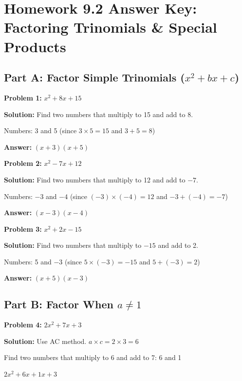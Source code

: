 \documentclass[12pt]{article}
\begin{document}
\section*{Homework 9.2 Answer Key: \\ Factoring Trinomials \& Special Products}

	\subsection*{Part A: Factor Simple Trinomials ($x^2 + bx + c$)}

		\textbf{Problem 1:} $x^2 + 8x + 15$
		
		\textbf{Solution:} Find two numbers that multiply to 15 and add to 8.
		
		Numbers: 3 and 5 (since $3 \times 5 = 15$ and $3 + 5 = 8$)
		
		\textbf{Answer:} $(x + 3)(x + 5)$

		\vspace{0.5cm}

		\textbf{Problem 2:} $x^2 - 7x + 12$
		
		\textbf{Solution:} Find two numbers that multiply to 12 and add to $-7$.
		
		Numbers: $-3$ and $-4$ (since $(-3) \times (-4) = 12$ and $-3 + (-4) = -7$)
		
		\textbf{Answer:} $(x - 3)(x - 4)$

		\vspace{0.5cm}

		\textbf{Problem 3:} $x^2 + 2x - 15$
		
		\textbf{Solution:} Find two numbers that multiply to $-15$ and add to 2.
		
		Numbers: 5 and $-3$ (since $5 \times (-3) = -15$ and $5 + (-3) = 2$)
		
		\textbf{Answer:} $(x + 5)(x - 3)$

	\newpage

	\subsection*{Part B: Factor When $a \neq 1$}

		\textbf{Problem 4:} $2x^2 + 7x + 3$
		
		\textbf{Solution:} Use AC method. $a \times c = 2 \times 3 = 6$
		
		Find two numbers that multiply to 6 and add to 7: 6 and 1
		
		$2x^2 + 6x + 1x + 3$
		
\end{document}
